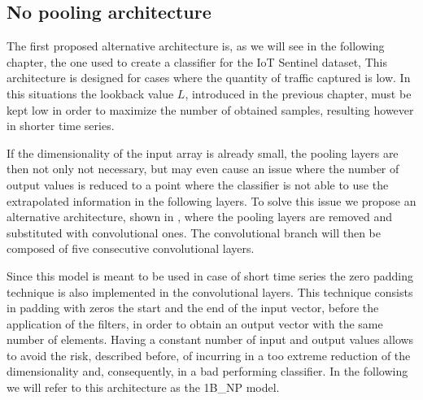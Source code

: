 \subsection{No pooling architecture}\label{npmodels}

The first proposed alternative architecture is, as we will see in the following chapter, the one used to create a classifier for the IoT Sentinel dataset, This architecture is designed for cases where the quantity of traffic captured is low. In this situations the lookback value $L$, introduced in the previous chapter, must be kept low in order to maximize the number of obtained samples, resulting however in shorter time series. 

If the dimensionality of the input array is already small, the pooling layers are then not only not necessary, but may even cause an issue where the number of output values is reduced to a point where the classifier is not able to use the extrapolated information in the following layers.
To solve this issue we propose an alternative architecture, shown in , where the pooling layers are removed and substituted with convolutional ones. The convolutional branch will then be composed of five consecutive convolutional layers.

Since this model is meant to be used in case of short time series the zero padding technique is also implemented in the convolutional layers. This technique consists in padding with zeros the start and the end of the input vector, before the application of the filters, in order to obtain an output vector with the same number of elements. Having a constant number of input and output values allows to avoid the risk, described before, of incurring in a too extreme reduction of the dimensionality and, consequently, in a bad performing classifier.
In the following we will refer to this architecture as the 1B\_NP model. 

